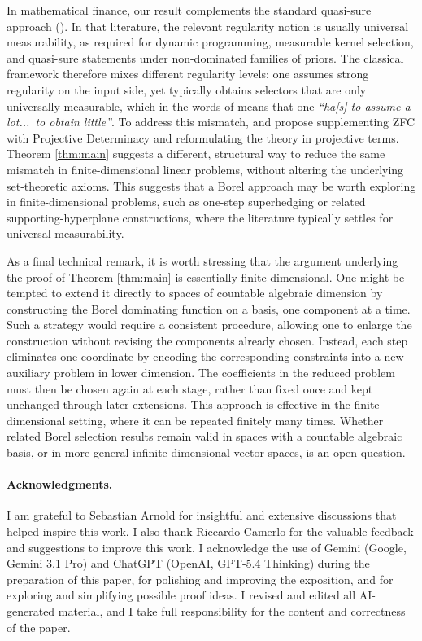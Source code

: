 \documentclass[10pt, a4paper]{article}
\begin{document}
In mathematical finance, our result complements the standard quasi-sure approach (\cite{bouchard2015arbitrage,nutz2016utility}). In that literature, the relevant regularity notion is usually universal measurability, as required for dynamic programming, measurable kernel selection, and quasi-sure statements under non-dominated families of priors. The classical framework therefore mixes different regularity levels: one assumes strong regularity on the input side, yet typically obtains selectors that are only universally measurable, which in the words of \cite{boistard2025robust} means that one \textit{``ha[s] to assume a lot...\ to obtain little''}. To address this mismatch, \cite{carassus2024nonconcave} and \cite{boistard2025robust} propose supplementing ZFC with Projective Determinacy and reformulating the theory in projective terms. Theorem \ref{thm:main} suggests a different, structural way to reduce the same mismatch in finite-dimensional linear problems, without altering the underlying set-theoretic axioms. This suggests that a Borel approach may be worth exploring in finite-dimensional problems, such as one-step superhedging or related supporting-hyperplane constructions, where the literature typically settles for universal measurability.

As a final technical remark, it is worth stressing that the argument underlying the proof of Theorem \ref{thm:main} is essentially finite-dimensional. One might be tempted to extend it directly to spaces of countable algebraic dimension by constructing the Borel dominating function on a basis, one component at a time. Such a strategy would require a consistent procedure, allowing one to enlarge the construction without revising the components already chosen. Instead, each step eliminates one coordinate by encoding the corresponding constraints into a new auxiliary problem in lower dimension. The coefficients in the reduced problem must then be chosen again at each stage, rather than fixed once and kept unchanged through later extensions. This approach is effective in  the finite-dimensional setting, where it can be repeated finitely many times. Whether related Borel selection results remain valid in spaces with a countable algebraic basis, or in more general infinite-dimensional vector spaces, is an open question.

\paragraph{Acknowledgments.}
I am grateful to Sebastian Arnold for insightful and extensive discussions that helped inspire this work. I also thank Riccardo Camerlo for the valuable feedback and suggestions to improve this work. I acknowledge the use of Gemini (Google, Gemini 3.1 Pro) and ChatGPT (OpenAI, GPT-5.4 Thinking) during the preparation of this paper, for polishing and improving the exposition, and for exploring and simplifying possible proof ideas. I revised and edited all AI-generated material, and I take full responsibility for the content and correctness of the paper.


\end{document}
